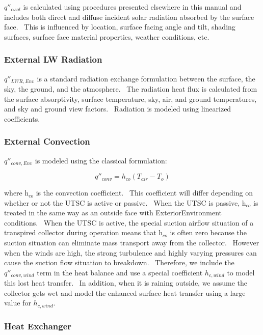 \(q''_{\alpha sol}\) is calculated using procedures presented elsewhere in this manual and includes both direct and diffuse incident solar radiation absorbed by the surface face.~ This is influenced by location, surface facing angle and tilt, shading surfaces, surface face material properties, weather conditions, etc.

\subsubsection{External LW Radiation}\label{external-lw-radiation-000}

\({q''_{LWR,Env}}\) is a standard radiation exchange formulation between the surface, the sky, the ground, and the atmosphere.~ The radiation heat flux is calculated from the surface absorptivity, surface temperature, sky, air, and ground temperatures, and sky and ground view factors.~ Radiation is modeled using linearized coefficients.

\subsubsection{External Convection}\label{external-convection-000}

\(q''_{conv,Env}\) is modeled using the classical formulation:

\begin{equation}
{q''_{conv}} = {h_{co}}(T_{air} - T_{o})
\end{equation}

where h\(_{co}\) is the convection coefficient.~ This coefficient will differ depending on whether or not the UTSC is active or passive.~ When the UTSC is passive, h\(_{co}\) is treated in the same way as an outside face with ExteriorEnvironment conditions.~ When the UTSC is active, the special suction airflow situation of a transpired collector during operation means that h\(_{co}\) is often zero because the suction situation can eliminate mass transport away from the collector.~ However when the winds are high, the strong turbulence and highly varying pressures can cause the suction flow situation to breakdown.~ Therefore, we include the \({q''_{conv,wind}}\) term in the heat balance and use a special coefficient \({h_{c,wind}}\) to model this lost heat transfer.~ In addition, when it is raining outside, we assume the collector gets wet and model the enhanced surface heat transfer using a large value for \({h_{c,wind}}\).

\subsubsection{Heat Exchanger}\label{heat-exchanger}

